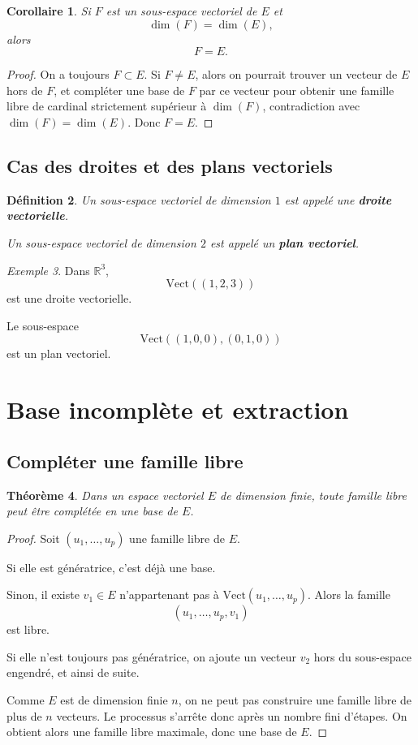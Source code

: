 \documentclass[11pt,a4paper]{article}
\newtheorem{definition}{Définition}[section]
\newtheorem{theoreme}[definition]{Théorème}
\newtheorem{corollaire}[definition]{Corollaire}
\theoremstyle{remark}
\newtheorem{exemple}[definition]{Exemple}
\newcommand{\R}{\mathbb{R}}
\newcommand{\Vect}{\mathrm{Vect}}
\begin{document}
\begin{corollaire}
Si \(F\) est un sous-espace vectoriel de \(E\) et
\[
\dim(F)=\dim(E),
\]
alors
\[
F=E.
\]
\end{corollaire}

\begin{proof}
On a toujours \(F\subset E\). Si \(F\neq E\), alors on pourrait trouver un vecteur de \(E\) hors de \(F\), et compléter une base de \(F\) par ce vecteur pour obtenir une famille libre de cardinal strictement supérieur à \(\dim(F)\), contradiction avec \(\dim(F)=\dim(E)\). Donc \(F=E\).
\end{proof}

\subsection{Cas des droites et des plans vectoriels}

\begin{definition}
Un sous-espace vectoriel de dimension \(1\) est appelé une \textbf{droite vectorielle}.

Un sous-espace vectoriel de dimension \(2\) est appelé un \textbf{plan vectoriel}.
\end{definition}

\begin{exemple}
Dans \(\R^3\),
\[
\Vect((1,2,3))
\]
est une droite vectorielle.

Le sous-espace
\[
\Vect((1,0,0),(0,1,0))
\]
est un plan vectoriel.
\end{exemple}

\section{Base incomplète et extraction}

\subsection{Compléter une famille libre}

\begin{theoreme}
Dans un espace vectoriel \(E\) de dimension finie, toute famille libre peut être complétée en une base de \(E\).
\end{theoreme}

\begin{proof}
Soit \((u_1,\dots,u_p)\) une famille libre de \(E\).

Si elle est génératrice, c’est déjà une base.

Sinon, il existe \(v_1\in E\) n’appartenant pas à \(\Vect(u_1,\dots,u_p)\). Alors la famille
\[
(u_1,\dots,u_p,v_1)
\]
est libre.

Si elle n’est toujours pas génératrice, on ajoute un vecteur \(v_2\) hors du sous-espace engendré, et ainsi de suite.

Comme \(E\) est de dimension finie \(n\), on ne peut pas construire une famille libre de plus de \(n\) vecteurs. Le processus s’arrête donc après un nombre fini d’étapes. On obtient alors une famille libre maximale, donc une base de \(E\).
\end{proof}
\end{document}
